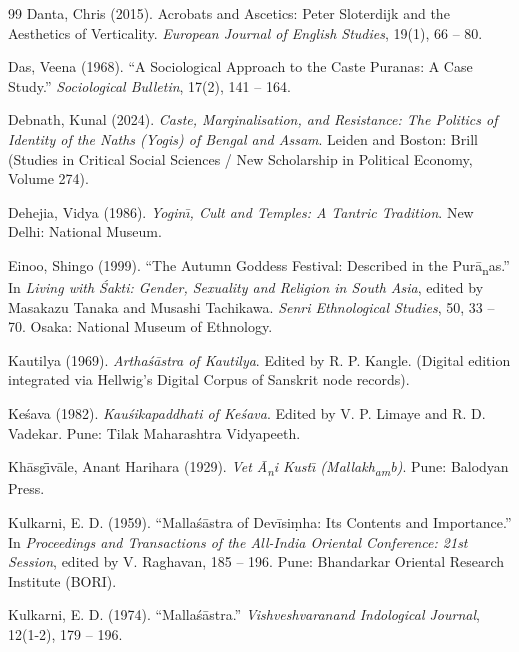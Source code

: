 \documentclass[11pt,twoside,letterpaper]{article}
\begin{document}
\begin{thebibliography}{99}
Danta, Chris (2015). Acrobats and Ascetics: Peter Sloterdijk and the Aesthetics of Verticality. \textit{European Journal of English Studies}, 19(1), 66 -- 80.

Das, Veena (1968). ``A Sociological Approach to the Caste Puranas: A Case Study.'' \textit{Sociological Bulletin}, 17(2), 141 -- 164.

Debnath, Kunal (2024). \textit{Caste, Marginalisation, and Resistance: The Politics of Identity of the Naths (Yogis) of Bengal and Assam}. Leiden and Boston: Brill (Studies in Critical Social Sciences / New Scholarship in Political Economy, Volume 274).

Dehejia, Vidya (1986). \textit{Yogin\={\i}, Cult and Temples: A Tantric Tradition}. New Delhi: National Museum.

Einoo, Shingo (1999). ``The Autumn Goddess Festival: Described in the Pur\={a}\textsubscript{n}as.'' In \textit{Living with \'Sakti: Gender, Sexuality and Religion in South Asia}, edited by Masakazu Tanaka and Musashi Tachikawa. \textit{Senri Ethnological Studies}, 50, 33 -- 70. Osaka: National Museum of Ethnology.

Kautilya (1969). \textit{Artha\'s\={a}stra of Kautilya}. Edited by R. P. Kangle. (Digital edition integrated via Hellwig's Digital Corpus of Sanskrit node records).

Ke\'sava (1982). \textit{Kau\'sikapaddhati of Ke\'sava}. Edited by V. P. Limaye and R. D. Vadekar. Pune: Tilak Maharashtra Vidyapeeth.

Kh\={a}sg\={\={\i}}v\={a}le, Anant Harihara (1929). \textit{Vet \={A}\textsubscript{n}i Kust\={\i} (Mallakh\textsubscript{a}\textsubscript{m}b)}. Pune: Balodyan Press.

Kulkarni, E. D. (1959). ``Malla\'s\={a}stra of Dev\={i}si\d{m}ha: Its Contents and Importance.'' In \textit{Proceedings and Transactions of the All-India Oriental Conference: 21st Session}, edited by V. Raghavan, 185 -- 196. Pune: Bhandarkar Oriental Research Institute (BORI).

Kulkarni, E. D. (1974). ``Malla\'s\={a}stra.'' \textit{Vishveshvaranand Indological Journal}, 12(1-2), 179 -- 196.


\end{thebibliography}
\end{document}
